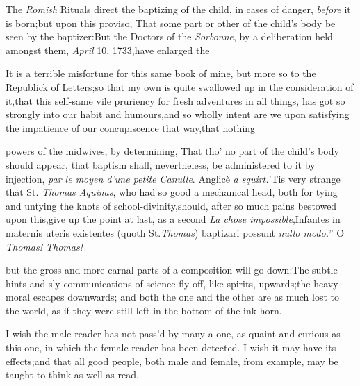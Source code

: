 \documentclass{article}
\begin{document}
\vfill
\bgroup\fontsize{8}{11}\selectfont
\indent\fnast\enspace The \textit{Romish} Rituals direct
the baptizing of the child, in cases of danger, \textit{before} it is born;\tsk  but
upon this proviso, That some part or other of the child’s body be seen by the
baptizer:\tsh  But the Doctors of the \textit{Sorbonne}, by a deliberation held
amongst them, \textit{April} 10, 1733,\tsk  have enlarged
the\break{}\par\egroup\eject

It is a terrible misfortune for this same book of mine, but more
so to the Republick of Letters;\tsk  so that my own\break
is quite swallowed up in the consideration of it,\tsk  that this
self-same vile pruriency for fresh adventures in all things, has
got so strongly into our habit and humours,\tsk  and so wholly
intent are we upon satisfying the impatience of our
concupiscence that way,\tsk  that nothing\break{}


\bgroup\fontsize{8}{11}\selectfont
\noindent powers of the midwives, by determining, That\break
tho’ no part of the child’s body should appear,\tsk\break
that baptism shall, nevertheless, be administered to it by injection,\tsk
\textit{par le moyen d’une petite Canulle}.\tsk\break
Anglicè \textit{a squirt.}\tsk  ’Tis very strange that St.\@
\textit{Thomas Aquinas}, who had so good a mechanical head, both
for tying and untying the knots of school-divinity,\tsk  should,
after so much pains bestowed upon this,\tsk  give up the point
at last, as a second \textit{La chose impossible},\tsk \lqq Infantes
in maternis uteris existentes (quoth St.\@  \textit{Thomas})
baptizari possunt \textit{nullo modo.}”\tsk\break
O \textit{Thomas! Thomas!}\\\par\egroup\eject

\noindent
but the gross and more carnal parts of a composition will go
down:\tsk  The subtle hints and sly communications of science
fly off, like spirits, upwards;\tsk  the heavy moral escapes
downwards; and both the one and the other are as much lost to
the world, as if they were still left in the bottom of the
ink-horn.

I wish the male-reader has not pass’d by many a one, as
quaint and curious as this one, in which the female-reader has been
detected. I wish it may have its effects;\tsk  and that all good
people, both male and female, from example, may be taught to think
as well as read.

\end{document}
